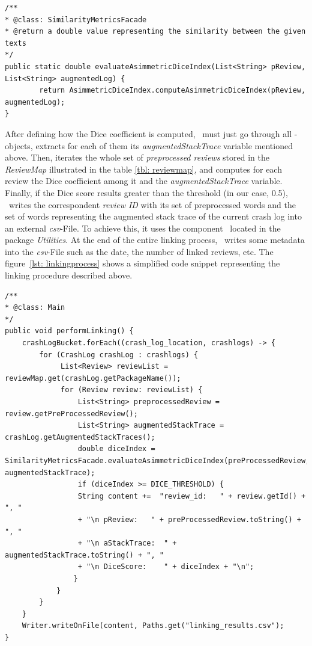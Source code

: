 \begin{lstlisting}[caption=\Facade\ implementing the design pattern \textit{Facade},label={lst: facade}]
/**
* @class: SimilarityMetricsFacade
* @return a double value representing the similarity between the given texts
*/
public static double evaluateAsimmetricDiceIndex(List<String> pReview, List<String> augmentedLog) {
        return AsimmetricDiceIndex.computeAsimmetricDiceIndex(pReview, augmentedLog);
}
\end{lstlisting}
After defining how the Dice coefficient is computed, \toolname\ must just go through all \Crash-objects, extracts for each of them its \textit{augmentedStackTrace} variable mentioned above. Then, iterates the whole set of \textit{preprocessed reviews} stored in the \textit{ReviewMap} illustrated in the table \ref{tbl: reviewmap}, and computes for each review the Dice coefficient among it and the \textit{augmentedStackTrace} variable. 
Finally, if the Dice score results greater than the threshold (in our case, 0.5), \toolname\ writes the correspondent \textit{review ID} with its set of preprocessed words and the set of words representing the augmented stack trace of the current crash log into an external \textit{csv}-File. To achieve this, it uses the component \Writer\, located in the package \textit{Utilities}. 
At the end of the entire linking process, \toolname\ writes some metadata into the \textit{csv}-File such as the date, the number of linked reviews, etc. 
The figure~\ref{lst: linkingprocess} shows a simplified code snippet representing the linking procedure described above. 
\begin{lstlisting}[caption=Linking process,label={lst: linkingprocess}]
/**
* @class: Main
*/
public void performLinking() {
	crashLogBucket.forEach((crash_log_location, crashlogs) -> {
		for (CrashLog crashLog : crashlogs) {
			 List<Review> reviewList = reviewMap.get(crashLog.getPackageName());
			 for (Review review: reviewList) {
			 	 List<String> preprocessedReview = review.getPreProcessedReview();	
			 	 List<String> augmentedStackTrace = crashLog.getAugmentedStackTraces();
			 	 double diceIndex = SimilarityMetricsFacade.evaluateAsimmetricDiceIndex(preProcessedReview, augmentedStackTrace);
			 	 if (diceIndex >= DICE_THRESHOLD) {	 
			 	 String content +=	"review_id:   " + review.getId() + ", "
	             + "\n pReview:   " + preProcessedReview.toString() + ", "
	             + "\n aStackTrace:  " + augmentedStackTrace.toString() + ", "
	             + "\n DiceScore:    " + diceIndex + "\n";                     
			 	}
			}
		}
	}
	Writer.writeOnFile(content, Paths.get("linking_results.csv");
}
\end{lstlisting}
